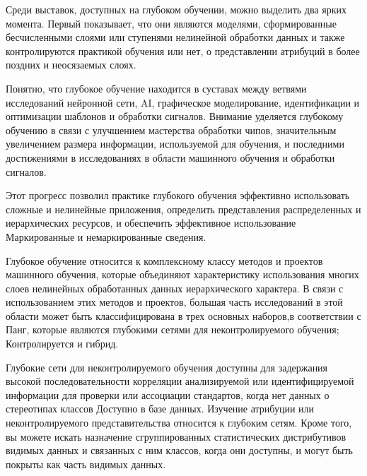 Среди выставок, доступных на глубоком обучении, можно выделить два ярких момента. Первый показывает, что они являются моделями,
сформированные бесчисленными слоями или ступенями нелинейной обработки данных и также контролируются практикой обучения или нет,
о представлении атрибуций в более поздних и неосязаемых слоях.

Понятно, что глубокое обучение находится в суставах между ветвями исследований нейронной сети, AI,
графическое моделирование, идентификации и оптимизации шаблонов и обработки сигналов.
Внимание уделяется глубокому обучению в связи с улучшением мастерства обработки чипов,
значительным увеличением размера информации, используемой для обучения,
и последними достижениями в исследованиях в области машинного обучения и обработки сигналов.

Этот прогресс позволил практике глубокого обучения эффективно использовать сложные и нелинейные приложения,
определить представления распределенных и иерархических ресурсов,
и обеспечить эффективное использование Маркированные и немаркированные сведения.

Глубокое обучение относится к комплексному классу методов и проектов машинного обучения, которые объединяют характеристику 
использования многих слоев нелинейных обработанных данных иерархического характера. В связи с использованием этих методов и проектов,
большая часть исследований в этой области может быть классифицирована в трех основных наборов,в соответствии с Панг,
которые являются глубокими сетями для неконтролируемого обучения; Контролируется и гибрид.

Глубокие сети для неконтролируемого обучения доступны для задержания высокой последовательности корреляции анализируемой или идентифицируемой информации для проверки или ассоциации стандартов,
когда нет данных о стереотипах классов Доступно в базе данных.
Изучение атрибуции или неконтролируемого представительства относится к глубоким сетям. Кроме того,
вы можете искать назначение сгруппированных статистических дистрибутивов видимых данных и связанных с ним классов,
когда они доступны, и могут быть покрыты как часть видимых данных.